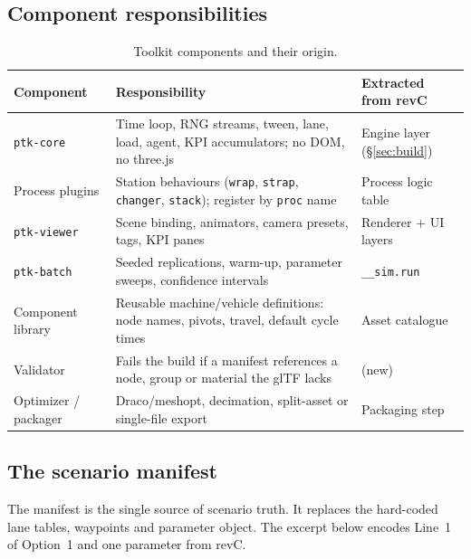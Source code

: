 \documentclass[11pt,a4paper]{article}
\begin{document}
\subsection{Component responsibilities}

\begin{table}[H]
\centering\small
\begin{tabularx}{\linewidth}{@{}l X X@{}}
\toprule
\textbf{Component} & \textbf{Responsibility} & \textbf{Extracted from revC}\\
\midrule
\texttt{ptk-core} & Time loop, RNG streams, tween, lane, load, agent, KPI accumulators; no DOM, no three.js & Engine layer (\S\ref{sec:build})\\
Process plugins & Station behaviours (\texttt{wrap}, \texttt{strap}, \texttt{changer}, \texttt{stack}); register by \texttt{proc} name & Process logic table\\
\texttt{ptk-viewer} & Scene binding, animators, camera presets, tags, KPI panes & Renderer + UI layers\\
\texttt{ptk-batch} & Seeded replications, warm-up, parameter sweeps, confidence intervals & \texttt{\_\_sim.run}\\
Component library & Reusable machine/vehicle definitions: node names, pivots, travel, default cycle times & Asset catalogue\\
Validator & Fails the build if a manifest references a node, group or material the glTF lacks & (new)\\
Optimizer / packager & Draco/meshopt, decimation, split-asset or single-file export & Packaging step\\
\bottomrule
\end{tabularx}
\caption{Toolkit components and their origin.}
\end{table}

\subsection{The scenario manifest}

The manifest is the single source of scenario truth. It replaces the hard-coded lane tables, waypoints and
parameter object. The excerpt below encodes Line~1 of Option~1 and one parameter from revC.
\end{document}
